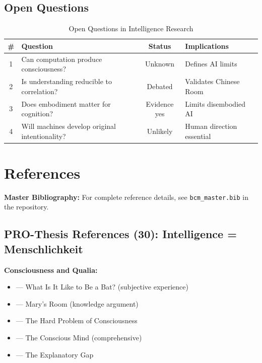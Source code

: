 \subsection{Open Questions}

\begin{table}[htbp]
\centering
\caption{Open Questions in Intelligence Research}
\renewcommand{\arraystretch}{1.3}
\begin{tabular}{@{}clcl@{}}
\toprule
\textbf{\#} & \textbf{Question} & \textbf{Status} & \textbf{Implications} \\
\midrule
1 & Can computation produce consciousness? & Unknown & Defines AI limits \\
2 & Is understanding reducible to correlation? & Debated & Validates Chinese Room \\
3 & Does embodiment matter for cognition? & Evidence yes & Limits disembodied AI \\
4 & Will machines develop original intentionality? & Unlikely & Human direction essential \\
\bottomrule
\end{tabular}
\end{table}


\section{References}
\label{sec:hi-references}

\begin{tcolorbox}[colback=blue!5!white, colframe=blue!75!black]
\textbf{Master Bibliography:} For complete reference details, see
\texttt{bcm\_master.bib} in the repository.
\end{tcolorbox}

\subsection{PRO-Thesis References (30): Intelligence = Menschlichkeit}

\textbf{Consciousness and Qualia:}
\begin{itemize}[nosep]
    \item \citet{PAP-nagel1974whatisit} --- What Is It Like to Be a Bat? (subjective experience)
    \item \citet{PAP-jackson1982epiphenomenal} --- Mary's Room (knowledge argument)
    \item \citet{PAP-chalmers1995facing} --- The Hard Problem of Consciousness
    \item \citet{PAP-chalmers1996conscious} --- The Conscious Mind (comprehensive)
    \item \citet{PAP-levine1983materialism} --- The Explanatory Gap
\end{itemize}

